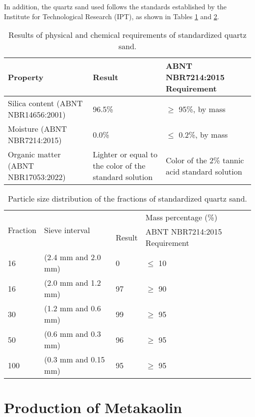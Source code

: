 In addition, the quartz sand used follows the standards established by the Institute for Technological Research (IPT), as shown in Tables \ref{tab:quartz_sand_properties} and \ref{tab:quartz_sand_granulometry}.

\begin{table}[H]
    \caption{Results of physical and chemical requirements of standardized quartz sand.}
    \label{tab:quartz_sand_properties}
    \center
    \begin{tabular}{p{} p{} p{}}
        \hline
        Property & Result & ABNT NBR7214:2015 Requirement\\
        \hline
        Silica content (ABNT NBR14656:2001) & 96.5\% & $\geq$ 95\%, by mass \\
        Moisture (ABNT NBR7214:2015) & 0.0\% & $\leq$ 0.2\%, by mass \\
        Organic matter (ABNT NBR17053:2022) & Lighter or equal to the color of the standard solution & Color of the 2\% tannic acid standard solution \\
        \hline
    \end{tabular}
\end{table}

\begin{table}[H]
    \caption{Particle size distribution of the fractions of standardized quartz sand.}
    \label{tab:quartz_sand_granulometry}
    \centering
    \begin{tabular}{p{} p{} p{} p{}}
        \hline
        \multirow{2}{*}{Fraction} & \multirow{2}{*}{Sieve interval} & \multicolumn{2}{c}{Mass percentage (\%)} \\ \cline{3-4}       
        & & Result & ABNT NBR7214:2015 Requirement\\
        \hline
        16 & (2.4 mm and 2.0 mm) & 0 & $\leq$ 10 \\
        16 & (2.0 mm and 1.2 mm) & 97 & $\geq$ 90 \\
        30 & (1.2 mm and 0.6 mm) & 99 & $\geq$ 95 \\
        50 & (0.6 mm and 0.3 mm) & 96 & $\geq$ 95 \\
        100 & (0.3 mm and 0.15 mm) & 95 & $\geq$ 95 \\
        \hline
    \end{tabular}
\end{table}

\section{Production of Metakaolin}
\label{sec:production_of_metakaolin}

